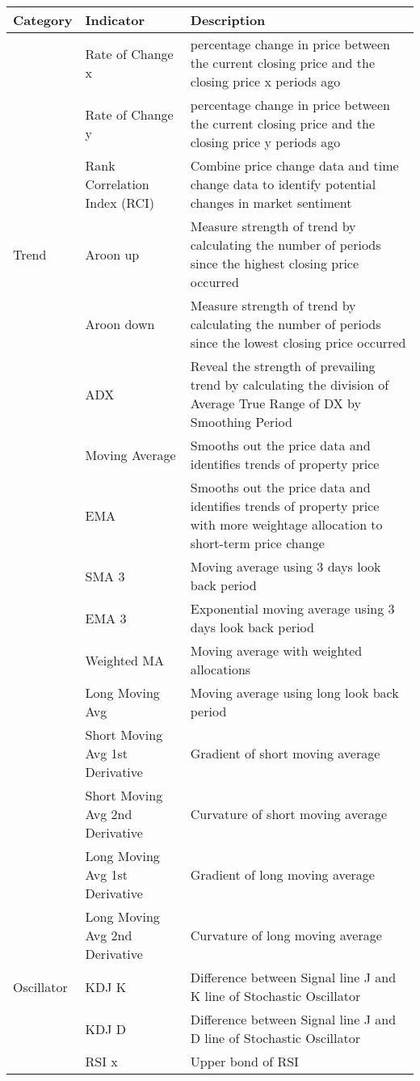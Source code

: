 \documentclass{article}
\begin{document}
\begin{table}[h!]
\centering
\begin{tabular}{|p{2cm}|p{4cm}|p{6cm}|}
\hline
\textbf{Category} & \textbf{Indicator} & {Description}\\
\hline
{} & Rate of Change x & percentage change in price between the current closing price and the closing price x periods ago \\
\hline
{} & Rate of Change y & percentage change in price between the current closing price and the closing price y periods ago \\
\hline
{} & Rank Correlation Index (RCI) & Combine price change data and time change data to identify potential changes in market sentiment \\
\hline
Trend & Aroon up & Measure strength of trend by calculating the number of periods since the highest closing price occurred \\
\hline
{} & Aroon down & Measure strength of trend by calculating the number of periods since the lowest closing price occurred \\
\hline
{} & ADX & Reveal the strength of prevailing trend by calculating the division of Average True Range of DX by Smoothing Period \\
\hline
{} & Moving Average & Smooths out the price data and identifies trends of property price \\
\hline
{} & EMA & Smooths out the price data and identifies trends of property price with more weightage allocation to short-term price change \\
\hline
{} & SMA 3 & Moving average using 3 days look back period \\
\hline
{} & EMA 3 & Exponential moving average using 3 days look back period \\
\hline
{} & Weighted MA & Moving average with weighted allocations \\
\hline
{} & Long Moving Avg & Moving average using long look back period \\
\hline
{} & Short Moving Avg 1st Derivative & Gradient of short moving average \\
\hline
{} & Short Moving Avg 2nd Derivative & Curvature of short moving average \\
\hline
{} & Long Moving Avg 1st Derivative & Gradient of long moving average \\
\hline
{} & Long Moving Avg 2nd Derivative & Curvature of long moving average \\
\hline
Oscillator & KDJ K & Difference between Signal line J and K line of Stochastic Oscillator \\
\hline
{} & KDJ D & Difference between Signal line J and D line of Stochastic Oscillator \\
\hline
{} & RSI x & Upper bond of RSI \\
\hline
\end{tabular}
\end{table}
\end{document}
